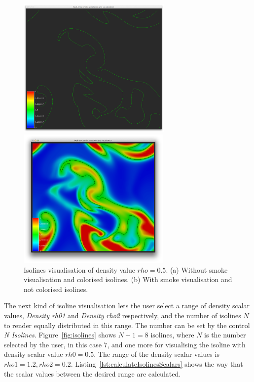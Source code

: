 \begin{figure}[htbp]
\begin{center}
\begin{minipage}[t]{0.48\textwidth}
\includegraphics[height=2.7in]{figures/isolines/isoline.png}
\end{minipage}
\begin{minipage}[t]{0.48\textwidth}
\includegraphics[height=2.7in]{figures/isolines/isolineSmoke.png}
\end{minipage}
\caption{Isolines visualisation of density value $rho = 0.5$. (a) Without smoke visualisation and colorised isolines. (b) With smoke visualisation and not colorised isolines.}
\label{fig:isoline}
\end{center}
\end{figure}

The next kind of isoline visualisation lets the user select a range of density scalar values, \emph{Density rh01} and \emph{Density rho2} respectively, and the number of isolines $N$ to render equally distributed in this range. The number can be set by the control \emph{N Isolines}. Figure~\ref{fig:isolines} shows $N + 1 = 8$ isolines, where $N$ is the number selected by the user, in this case 7, and one more for visualising the isoline with density scalar value $rh0 = 0.5$. The range of the density scalar values is $rho1 = 1.2, rho2 = 0.2$. Listing~\ref{lst:calculateIsolinesScalars} shows the way that the scalar values between the desired range are calculated.

